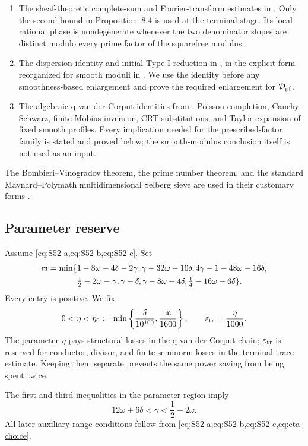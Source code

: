\begin{enumerate}[label=\textup{(\roman*)}]
\item\label{input:trace} The sheaf-theoretic complete-sum and Fourier-transform estimates in
\cite[Theorem~6.17, Corollary~6.24, and Proposition~8.4]{PolymathEDZ2014}.
Only the second bound in Proposition~8.4 is used at the terminal stage.  Its
local rational phase is nondegenerate whenever the two denominator slopes are
distinct modulo every prime factor of the squarefree modulus.
\item\label{input:outer} The dispersion identity and initial Type-I reduction
in \cite[Sections~5 and 8A]{PolymathEDZ2014}, in the explicit form reorganized
for smooth moduli in \cite{Stadlmann2025}.  We use the identity before any
smoothness-based enlargement and prove the required enlargement for $\mathcal D_{\mathrm{pf}}$.
\item\label{input:qvdc} The algebraic q-van der Corput identities from
\cite{Stadlmann2025}: Poisson completion, Cauchy--Schwarz, finite M\"obius
inversion, CRT substitutions, and Taylor expansion of fixed smooth profiles.
Every implication needed for the prescribed-factor family is stated and
proved below; the smooth-modulus conclusion itself is not used as an input.
\end{enumerate}

The Bombieri--Vinogradov theorem, the prime number theorem, and the standard
Maynard--Polymath multidimensional Selberg sieve are used in their customary
forms \cite{Maynard2015,PolymathSieve2014}.

\subsection{Parameter reserve}

Assume \cref{eq:S52-a,eq:S52-b,eq:S52-c}.  Set
\begin{align}
\mathfrak m=\min\{&1-8\omega-4\delta-2\gamma,
 \gamma-32\omega-10\delta,
 4\gamma-1-48\omega-16\delta,\notag\\
&\tfrac12-2\omega-\gamma,
 \gamma-\delta,
 \gamma-8\omega-4\delta,
 \tfrac14-16\omega-6\delta\}.
\label{eq:margin}
\end{align}
Every entry is positive.  We fix
\begin{equation}\label{eq:eta-choice}
 0<\eta<\eta_0:=
 \min\left\{\frac{\delta}{10^{100}},\frac{\mathfrak m}{1600}\right\},
 \qquad \varepsilon_{\rm tr}=\frac{\eta}{1000}.
\end{equation}
The parameter $\eta$ pays structural losses in the q-van der Corput chain;
$\varepsilon_{\rm tr}$ is reserved for conductor, divisor, and finite-seminorm
losses in the terminal trace estimate.  Keeping them separate prevents the
same power saving from being spent twice.

The first and third inequalities in the parameter region imply
\begin{equation}\label{eq:aux-range}
 12\omega+6\delta<\gamma<\frac12-2\omega.
\end{equation}
All later auxiliary range conditions follow from
\cref{eq:S52-a,eq:S52-b,eq:S52-c,eq:eta-choice}.
